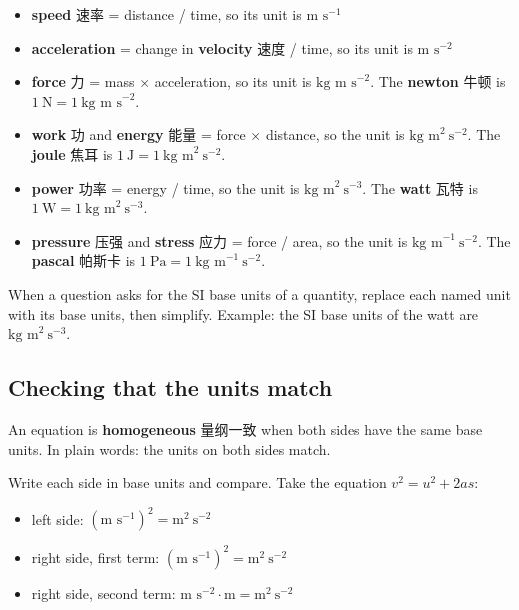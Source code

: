 \documentclass[11pt]{article}
\begin{document}
\begin{itemize}
\item \textbf{speed} 速率 = distance / time, so its unit is $\text{m s}^{-1}$

\item \textbf{acceleration} = change in \textbf{velocity} 速度 / time, so its unit is $\text{m s}^{-2}$

\item \textbf{force} 力 = mass × acceleration, so its unit is $\text{kg m s}^{-2}$. The \textbf{newton} 牛顿 is $1\ \text{N} = 1\ \text{kg m s}^{-2}$.

\item \textbf{work} 功 and \textbf{energy} 能量 = force × distance, so the unit is $\text{kg m}^{2}\ \text{s}^{-2}$. The \textbf{joule} 焦耳 is $1\ \text{J} = 1\ \text{kg m}^{2}\ \text{s}^{-2}$.

\item \textbf{power} 功率 = energy / time, so the unit is $\text{kg m}^{2}\ \text{s}^{-3}$. The \textbf{watt} 瓦特 is $1\ \text{W} = 1\ \text{kg m}^{2}\ \text{s}^{-3}$.

\item \textbf{pressure} 压强 and \textbf{stress} 应力 = force / area, so the unit is $\text{kg m}^{-1}\ \text{s}^{-2}$. The \textbf{pascal} 帕斯卡 is $1\ \text{Pa} = 1\ \text{kg m}^{-1}\ \text{s}^{-2}$.

\end{itemize}

When a question asks for the SI base units of a quantity, replace each named unit with its base units, then simplify. Example: the SI base units of the watt are $\text{kg m}^{2}\ \text{s}^{-3}$.

\subsection*{Checking that the units match}

An equation is \textbf{homogeneous} 量纲一致 when both sides have the same base units. In plain words: the units on both sides match.

Write each side in base units and compare. Take the equation $v^{2} = u^{2} + 2as$:

\begin{itemize}
\item left side: $(\text{m s}^{-1})^{2} = \text{m}^{2}\ \text{s}^{-2}$

\item right side, first term: $(\text{m s}^{-1})^{2} = \text{m}^{2}\ \text{s}^{-2}$

\item right side, second term: $\text{m s}^{-2} \cdot \text{m} = \text{m}^{2}\ \text{s}^{-2}$

\end{itemize}
\end{document}
